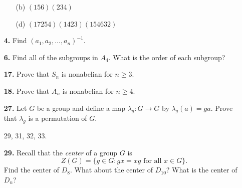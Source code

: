 \documentclass[12pt,reqno]{amsart}
\newcommand{\boldemph}{\emph}
\begin{document}
\begin{enumerate}[{\bf 1.}]
\bigskip

\begin{enumerate}
 

 \item[(b)]
$(156)(234)$
 
\vskip1cm
 
 \item[(d)]
$(17254)(1423)(154632)$
 
 
\end{enumerate}

\vskip2cm
 
\item[{\bf 4.}] 
Find $(a_1, a_2, \ldots, a_n)^{-1}$.

\newpage
 
\item[{\bf 6.}] 
Find all of the subgroups in $A_4$. What is the order of each
subgroup? 
 
\vskip10cm

\item[{\bf 17.}] 
Prove that $S_n$ is nonabelian for $n \geq 3$.

\vskip7cm
 
\item[{\bf 18.}] 
Prove that $A_n$ is nonabelian for $n \geq 4$.

\newpage
 
\item[{\bf 27.}] 
Let $G$ be a group and define a map $\lambda_g : G \rightarrow G$ by
$\lambda_g(a) = g a$.  Prove that $\lambda_g$ is a permutation of $G$.

\newpage

 29, 31, 32, 33.  
\\

\item[{\bf 29.}]  %
Recall that the \boldemph{center} of a group $G$ is
\[
Z(G) = \{ g \in G : \mbox{$gx = xg$ for all $x \in G$} \}.
\]
Find the center of $D_8$. What about the center of $D_{10}$? What is
the center of $D_n$? 
 

\end{enumerate}
\end{document}
